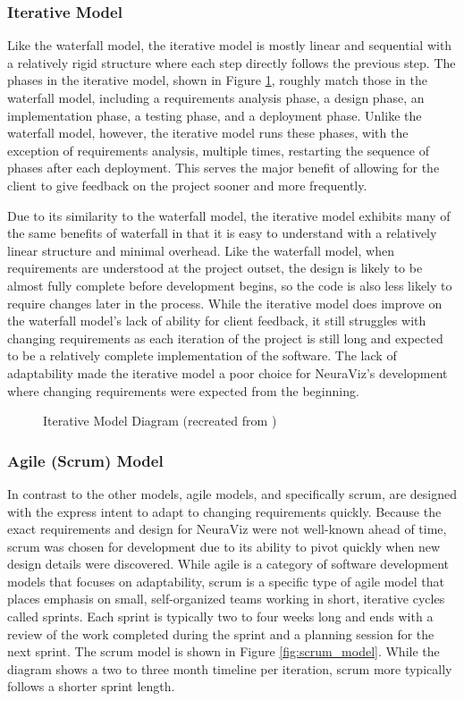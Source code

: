 \subsubsection{Iterative Model}
Like the waterfall model, the iterative model is mostly linear and sequential with a relatively rigid structure where each step directly follows the previous step. The phases in the iterative model, shown in Figure \ref{fig:iterative_model}, roughly match those in the waterfall model, including a requirements analysis phase, a design phase, an implementation phase, a testing phase, and a deployment phase. Unlike the waterfall model, however, the iterative model runs these phases, with the exception of requirements analysis, multiple times, restarting the sequence of phases after each deployment. This serves the major benefit of allowing for the client to give feedback on the project sooner and more frequently.

Due to its similarity to the waterfall model, the iterative model exhibits many of the same benefits of waterfall in that it is easy to understand with a relatively linear structure and minimal overhead. Like the waterfall model, when requirements are understood at the project outset, the design is likely to be almost fully complete before development begins, so the code is also less likely to require changes later in the process. While the iterative model does improve on the waterfall model's lack of ability for client feedback, it still struggles with changing requirements as each iteration of the project is still long and expected to be a relatively complete implementation of the software. The lack of adaptability made the iterative model a poor choice for NeuraViz's development where changing requirements were expected from the beginning.

\begin{figure}[htb]
    \centering
    
    \caption[Iterative Model Diagram]{Iterative Model Diagram (recreated from \cite{tutorialspoint})}
    \label{fig:iterative_model}
\end{figure}

\subsubsection{Agile (Scrum) Model}
In contrast to the other models, agile models, and specifically scrum, are designed with the express intent to adapt to changing requirements quickly. Because the exact requirements and design for NeuraViz were not well-known ahead of time, scrum was chosen for development due to its ability to pivot quickly when new design details were discovered. While agile is a category of software development models that focuses on adaptability, scrum is a specific type of agile model that places emphasis on small, self-organized teams working in short, iterative cycles called sprints. Each sprint is typically two to four weeks long and ends with a review of the work completed during the sprint and a planning session for the next sprint. The scrum model is shown in Figure \ref{fig:scrum_model}. While the diagram shows a two to three month timeline per iteration, scrum more typically follows a shorter sprint length.

